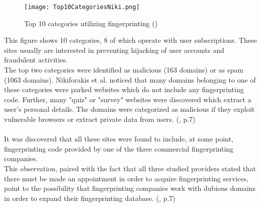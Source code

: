 \begin{figure}[H]
\centering
		\texttt{[image: Top10CategoriesNiki.png]}
		\caption{Top 10 categories utilizing fingerprinting (\textcite{Top10Niki})}
		\label{Top10Niki}
\end{figure}
This figure shows 10 categories, 8 of which operate with user subscriptions. These sites usually are interested in preventing hijacking of user accounts and fraudulent activities.\\
The top two categories were identified as malicious (163 domains) or as spam (1063 domains). Nikiforakis et al. noticed that many domains belonging to one of these categories were parked websites which do not include any fingerprinting code. Further, many "quiz" or "survey" websites were discovered which extract a user's personal details. The domains were categorized as malicious if they exploit vulnerable browsers or extract private data from users. (\textcite{nikiforakis13}, p.7)\\\\
It was discovered that all these sites were found to include, at some point, fingerprinting code provided by one of the three commercial fingerprinting companies.\\
This observation, paired with the fact that all three studied providers stated that there must be made an appointment in order to acquire fingerprinting services, point to the possibility that fingerprinting companies work with dubious domains in order to expand their fingerprinting database. (\textcite{nikiforakis13}, p.7)

